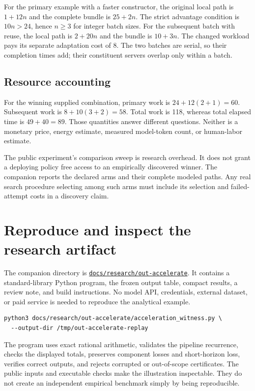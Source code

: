 \documentclass[11pt,letterpaper]{article}
\theoremstyle{remark}\newtheorem{remark}{Remark}[section]
\newcommand{\repo}{https://github.com/MontrealAI/AGI-Alpha-Invention-Flywheel-Lab}
\begin{document}
For the primary example with a faster constructor, the original local path is $1+12n$ and the complete bundle is $25+2n$.
The strict advantage condition is $10n>24$, hence $n\ge3$ for integer batch sizes.
For the subsequent batch with reuse, the local path is $2+20n$ and the bundle is $10+3n$.
The changed workload pays its separate adaptation cost of 8.
The two batches are serial, so their completion times add; their constituent servers overlap only within a batch.

\subsection{Resource accounting}
For the winning supplied combination, primary work is
$24+12(2+1)=60$.
Subsequent work is $8+10(3+2)=58$.
Total work is 118, whereas total elapsed time is $49+40=89$.
Those quantities answer different questions.
Neither is a monetary price, energy estimate, measured model-token count, or human-labor estimate.

The public experiment's comparison sweep is research overhead.
It does not grant a deploying policy free access to an empirically discovered winner.
The companion reports the declared arms and their complete modeled paths.
Any real search procedure selecting among such arms must include its selection and failed-attempt costs in a discovery claim.

\section{Reproduce and inspect the research artifact}\label{app:reproduce}
The companion directory is
\href{\repo/tree/main/docs/research/out-accelerate}{\texttt{docs/research/out-accelerate}}.
It contains a standard-library Python program, the frozen output table, compact results, a review note, and build instructions.
No model API, credentials, external dataset, or paid service is needed to reproduce the analytical example.

\begin{lstlisting}
python3 docs/research/out-accelerate/acceleration_witness.py \
  --output-dir /tmp/out-accelerate-replay
\end{lstlisting}

The program uses exact rational arithmetic, validates the pipeline recurrence, checks the displayed totals, preserves component losses and short-horizon loss, verifies correct outputs, and rejects corrupted or out-of-scope certificates.
The public inputs and executable checks make the illustration inspectable.
They do not create an independent empirical benchmark simply by being reproducible.
\end{document}
